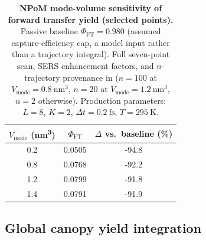 \documentclass[preprint,12pt]{elsarticle}
\begin{document}
\begin{table}[htbp]
\centering
\caption{\textbf{NPoM mode-volume sensitivity of forward transfer yield (selected points).} Passive baseline $\Phi_{\mathrm{FT}} = 0.980$ (assumed capture-efficiency cap, a model input rather than a trajectory integral). Full seven-point scan, SERS enhancement factors, and $n$-trajectory provenance in  ($n=100$ at $V_{\mathrm{mode}}=\qty{0.8}{\nm\cubed}$, $n=20$ at $V_{\mathrm{mode}}=\qty{1.2}{\nm\cubed}$, $n=2$ otherwise). Production parameters: $L=8$, $K=2$, $\Delta t = \qty{0.2}{\fs}$, $T=\qty{295}{\kelvin}$.}
\label{tab:npom_volume_scan}
\begin{tabular}{S[table-format=1.1] S[table-format=1.4] S[table-format=-2.1]}
\toprule
{$V_{\mathrm{mode}}$ (\unit{\nm\cubed})} & {$\Phi_{\mathrm{FT}}$} & {$\Delta$ vs.\ baseline (\unit{\percent})} \\
 & 0.0505 & -94.8 \\
0.8 & 0.0768 & -92.2 \\
1.2 & 0.0799 & -91.8 \\
1.4 & 0.0791 & -91.9 \\
\bottomrule
\end{tabular}
\end{table}

\subsection{Global canopy yield integration}
\end{document}

